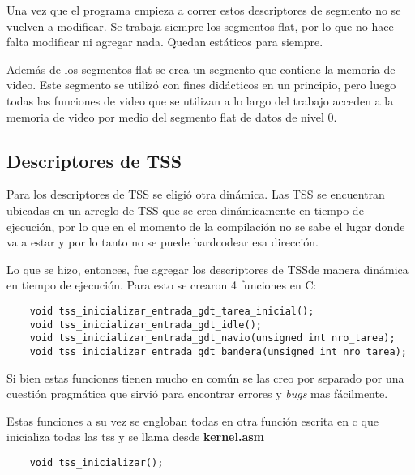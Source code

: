 	Una vez que el programa empieza a correr estos descriptores de segmento
no se vuelven a modificar. Se trabaja siempre los segmentos flat, por lo que no
hace falta modificar ni agregar nada. Quedan estáticos para siempre.

	Además de los segmentos flat se crea un segmento que contiene la memoria de video.
Este segmento se utilizó con fines didácticos en un principio, pero luego
todas las funciones de video que se utilizan a lo largo del trabajo acceden
a la memoria de video por medio del segmento flat de datos de nivel 0.

\subsection{Descriptores de TSS}

	Para los descriptores de TSS se eligió otra dinámica. Las TSS se encuentran
ubicadas en un arreglo de TSS que se crea dinámicamente en tiempo de ejecución, por lo
que en el momento de la compilación no se sabe el lugar donde va a estar y por lo tanto
no se puede hardcodear esa dirección.

	Lo que se hizo, entonces, fue agregar los descriptores de TSSde manera dinámica en tiempo
de ejecución. Para esto se crearon 4 funciones en C:

\begin{verbatim}
	void tss_inicializar_entrada_gdt_tarea_inicial();
	void tss_inicializar_entrada_gdt_idle();
	void tss_inicializar_entrada_gdt_navio(unsigned int nro_tarea);
	void tss_inicializar_entrada_gdt_bandera(unsigned int nro_tarea);
\end{verbatim}

	Si bien estas funciones tienen mucho en común se las creo por separado
por una cuestión pragmática que sirvió para encontrar errores y \textit{bugs} mas
fácilmente.

	Estas funciones a su vez se engloban todas en otra función escrita en c que
inicializa todas las tss y se llama desde \textbf{kernel.asm}


\begin{verbatim}
	void tss_inicializar();
\end{verbatim}





